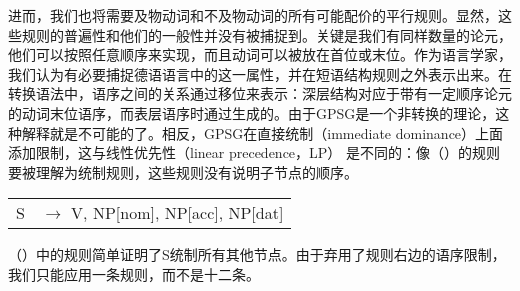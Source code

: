 \noindent
进而，我们也将需要及物动词和不及物动词的所有可能配价的平行规则。显然，这些规则的普遍性和他们的一般性并没有被捕捉到。关键是我们有同样数量的论元，他们可以按照任意顺序来实现，而且动词可以被放在首位或末位。作为语言学家，我们认为有必要捕捉德语语言中的这一属性，并在短语结构规则之外表示出来。在转换语法中，语序之间的关系通过移位来表示：深层结构对应于带有一定顺序论元的动词末位语序，而表层语序时通过\movealpha 生成的。由于GPSG是一个非转换的理论，这种解释就是不可能的了。相反，GPSG在直接统制（immediate dominance）上面添加限制，这与线性优先性（linear precedence，LP） 是不同的：像（）的规则要被理解为统制规则，这些规则没有说明子节点的顺序\citep{Pullum82a}。
\ea
\begin{tabular}[t]{@{}l@{ }l}
S  & $\to$ V, NP[nom], NP[acc], NP[dat]\\
\end{tabular}
\z
（）中的规则简单证明了S统制所有其他节点。由于弃用了规则右边的语序限制，我们只能应用一条规则，而不是十二条。

